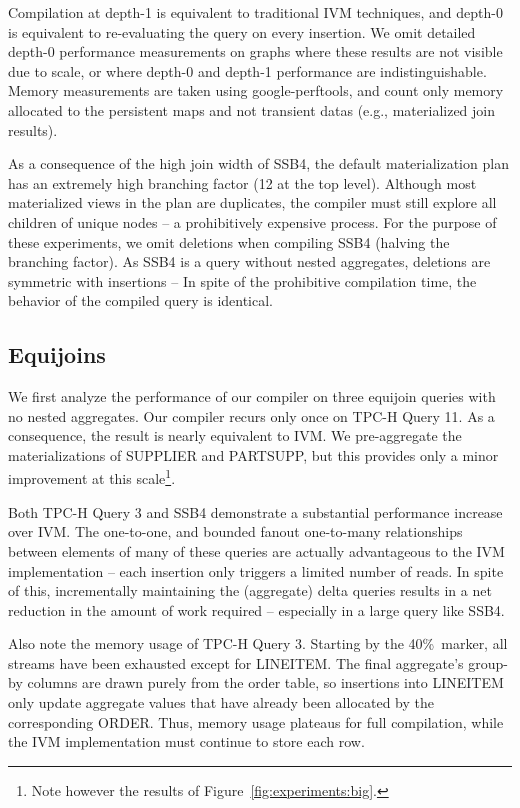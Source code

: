 Compilation at depth-1 is equivalent to traditional IVM techniques, and depth-0 is equivalent to re-evaluating the query on every insertion.  We omit detailed depth-0 performance measurements on graphs where these results are not visible due to scale, or where depth-0 and depth-1 performance are indistinguishable.  Memory measurements are taken using google-perftools\cite{perftools}, and count only memory allocated to the persistent maps and not transient datas (e.g., materialized join results).

As a consequence of the high join width of SSB4, the default materialization plan has an extremely high branching factor (12 at the top level).  Although most materialized views in the plan are duplicates, the compiler must still explore all children of unique nodes -- a prohibitively expensive process.  For the purpose of these experiments, we omit deletions when compiling SSB4 (halving the branching factor).  As SSB4 is a query without nested aggregates, deletions are symmetric with insertions -- In spite of the prohibitive compilation time, the behavior of the compiled query is identical.


\subsection{Equijoins}

We first analyze the performance of our compiler on three equijoin queries with no nested aggregates.  Our compiler recurs only once on TPC-H Query 11.  As a consequence, the result is nearly equivalent to IVM.  We pre-aggregate the materializations of SUPPLIER and PARTSUPP, but this provides only a minor improvement at this scale\footnote{Note however the results of Figure~\ref{fig:experiments:big}.}.  

Both TPC-H Query 3 and SSB4 demonstrate a substantial performance increase over IVM.  The one-to-one, and bounded fanout one-to-many relationships between elements of many of these queries are actually advantageous to the IVM implementation -- each insertion only triggers a limited number of reads.  In spite of this, incrementally maintaining the (aggregate) delta queries results in a net reduction in the amount of work required -- especially in a large query like SSB4.

Also note the memory usage of TPC-H Query 3.  Starting by the 40\%\ marker, all streams have been exhausted except for LINEITEM.  The final aggregate's group-by columns are drawn purely from the order table, so insertions into LINEITEM only update aggregate values that have already been allocated by the corresponding ORDER.  Thus, memory usage plateaus for full compilation, while the IVM implementation must continue to store each row.


